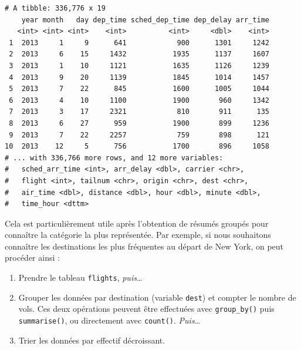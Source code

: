 \documentclass[
  a4paper,
]{article}
\newenvironment{Shaded}{\begin{snugshade}}{\end{snugshade}}
\newcommand{\KeywordTok}[1]{\textcolor[rgb]{0.12,0.11,0.11}{\textbf{#1}}}
\newcommand{\NormalTok}[1]{\textcolor[rgb]{0.12,0.11,0.11}{#1}}
\newcommand{\OperatorTok}[1]{\textcolor[rgb]{0.12,0.11,0.11}{#1}}
\newcommand{\StringTok}[1]{\textcolor[rgb]{0.75,0.01,0.01}{#1}}
\providecommand{\tightlist}{%
  \setlength{\itemsep}{0pt}\setlength{\parskip}{0pt}}
\begin{document}
\begin{verbatim}
# A tibble: 336,776 x 19
    year month   day dep_time sched_dep_time dep_delay arr_time
   <int> <int> <int>    <int>          <int>     <dbl>    <int>
 1  2013     1     9      641            900      1301     1242
 2  2013     6    15     1432           1935      1137     1607
 3  2013     1    10     1121           1635      1126     1239
 4  2013     9    20     1139           1845      1014     1457
 5  2013     7    22      845           1600      1005     1044
 6  2013     4    10     1100           1900       960     1342
 7  2013     3    17     2321            810       911      135
 8  2013     6    27      959           1900       899     1236
 9  2013     7    22     2257            759       898      121
10  2013    12     5      756           1700       896     1058
# ... with 336,766 more rows, and 12 more variables:
#   sched_arr_time <int>, arr_delay <dbl>, carrier <chr>,
#   flight <int>, tailnum <chr>, origin <chr>, dest <chr>,
#   air_time <dbl>, distance <dbl>, hour <dbl>, minute <dbl>,
#   time_hour <dttm>
\end{verbatim}

Cela est particulièrement utile après l'obtention de résumés groupés pour connaître la catégorie la plus représentée. Par exemple, si nous souhaitons connaître les destinations les plus fréquentes au départ de New York, on peut procéder ainsi :

\begin{enumerate}
\def\labelenumi{\arabic{enumi}.}
\tightlist
\item
  Prendre le tableau \texttt{flights}, \emph{puis}\ldots{}
\item
  Grouper les données par destination (variable \texttt{dest}) et compter le nombre de vols. Ces deux opérations peuvent être effectuées avec \texttt{group\_by()} puis \texttt{summarise()}, ou directement avec \texttt{count()}. \emph{Puis}\ldots{}
\item
  Trier les données par effectif décroissant.
\end{enumerate}

\begin{Shaded}
\end{Shaded}
\end{document}
